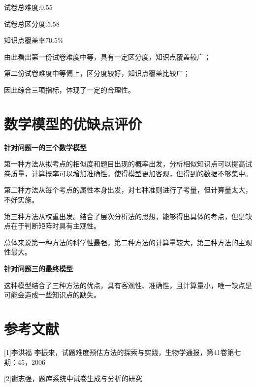 \documentclass{ctexart}
\begin{document}
试卷总难度:0.55

试卷总区分度:5.58

知识点覆盖率70.5\%

由此看出第一份试卷难度中等，具有一定区分度，知识点覆盖较广；

第二份试卷难度中等偏上，区分度较好，知识点覆盖比较广；

因此综合三项指标，体现了一定的合理性。
\section{数学模型的优缺点评价}

\textbf{针对问题一的三个数学模型}

第一种方法从拟考点的相似度和题目出现的概率出发，分析相似知识点可以提高试卷质量，计算概率可以增加准确性，使得模型更加客观，但得到的数据不够集中。

第二种方法从每个考点的属性本身出发，对七种准则进行了考量，但计算量太大，不好实施。

第三种方法从权重出发。结合了层次分析法的思想，能够得出具体的考点，但是缺点在于判断矩阵时具有主观性。

总体来说第一种方法的科学性最强，第二种方法的计算量较大，第三种方法的主观性最大。

\textbf{针对问题三的最终模型}

这种模型结合了三种方法的优点，具有客观性、准确性，且计算量小，唯一缺点是可能会造成一些知识点的缺失。

\section{参考文献}
[1]李洪福 李振来，试题难度预估方法的探索与实践，生物学通报，第41卷第七期：45，2006

[2]谢志强，题库系统中试卷生成与分析的研究
\end{document}
